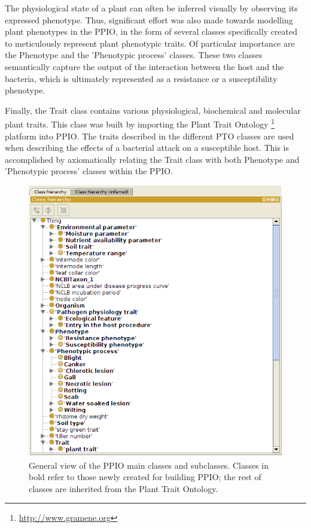 \documentclass[sw]{iosart2c}
\newcommand{\myurl}[1]{\footnote{\url{#1}}}
\begin{document}
The physiological state of a plant can often be inferred visually by observing its expressed phenotype. Thus, significant effort was also made towards modelling plant phenotypes in the PPIO, in the form of several classes specifically created to meticulously represent plant phenotypic traits.  Of particular importance are the {\sf Phenotype} and the {\sf 'Phenotypic process'} classes. These two classes semantically capture the output of the interaction between the host and the bacteria, which is ultimately represented as a resistance or a susceptibility phenotype.

Finally, the {\sf Trait} class contains various physiological, biochemical and molecular plant traits. This class was built by importing the Plant Trait Ontology \myurl{http://www.gramene.org} platform \cite{PTO} into PPIO. The traits described in the different PTO classes are used when describing the effects of a bacterial attack on a susceptible host. This is accomplished by axiomatically relating the {\sf Trait} class with both {\sf Phenotype} and {\sf 'Phenotypic process'} classes within the PPIO.

\begin{figure}
\includegraphics{PPIO-classes2.png}
\caption{General view of the PPIO main classes and subclasses. Classes in bold refer to those newly created for building PPIO; the rest of classes are inherited from the Plant Trait Ontology.}\label{fig:ppio-classes}
\end{figure}
\end{document}
